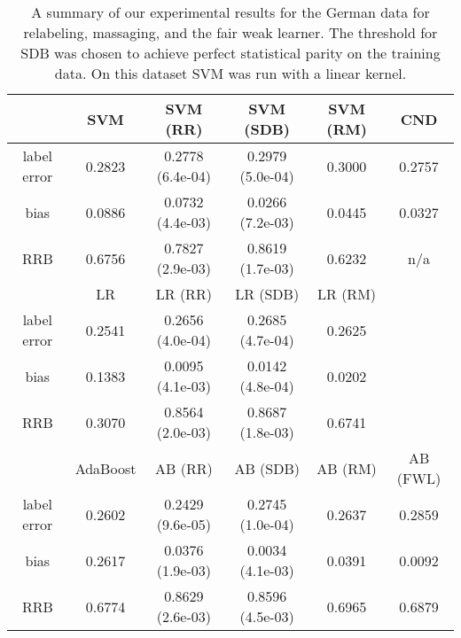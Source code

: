 \begin{table}[h]
\centering
\begin{tabular}{| c | ccccc |}
\hline
               & SVM & SVM (RR) & SVM (SDB) & SVM (RM) & CND \cite{KamiranC09} \\
\hline
label error    & 0.2823 & 0.2778 (6.4e-04) & 0.2979 (5.0e-04) & 0.3000 & 0.2757  \\
bias           & 0.0886 & 0.0732 (4.4e-03) & 0.0266 (7.2e-03) & 0.0445 & 0.0327   \\
RRB            & 0.6756 & 0.7827 (2.9e-03) & 0.8619 (1.7e-03) & 0.6232 & n/a  \\
\hline
               & LR & LR (RR) & LR (SDB) & LR (RM) &  \\
\hline
label error    & 0.2541 & 0.2656 (4.0e-04) & 0.2685 (4.7e-04) & 0.2625 &\\
bias           & 0.1383 & 0.0095 (4.1e-03) & 0.0142 (4.8e-04) & 0.0202 &\\
RRB            & 0.3070 & 0.8564 (2.0e-03) & 0.8687 (1.8e-03) & 0.6741 & \\
\hline
               & AdaBoost & AB (RR)  & AB (SDB)  & AB (RM)   & AB (FWL)  \\
\hline
label error    & 0.2602 & 0.2429 (9.6e-05) & 0.2745 (1.0e-04) & 0.2637 & 0.2859 \\
bias           & 0.2617 & 0.0376 (1.9e-03) & 0.0034 (4.1e-03) & 0.0391 & 0.0092 \\
RRB            & 0.6774 & 0.8629 (2.6e-03) & 0.8596 (4.5e-03) & 0.6965 & 0.6879 \\
\hline
\hline
\end{tabular}
\caption{A summary of our experimental results for the German data for
relabeling, massaging, and the fair weak learner. The threshold for SDB was
chosen to achieve perfect statistical parity on the training data. On this
dataset SVM was run with a linear kernel.}
\label{table:german_results}
\end{table}

